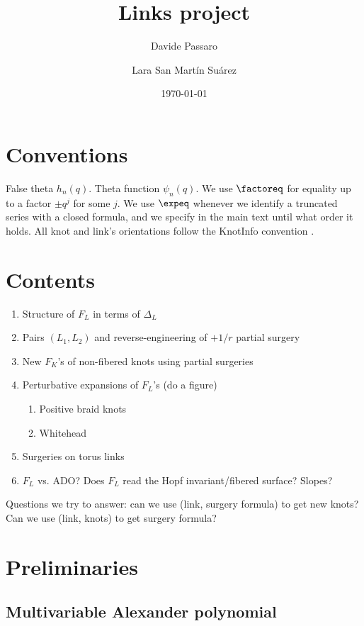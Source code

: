 \documentclass[11pt,e-only]{amsart}
\title{Links project}
\author[D. Passaro]{Davide Passaro}
\author[L. San Mart\'in Su\'arez]{Lara San Mart\'in Su\'arez}
\date{\today}
\begin{document}
\maketitle

\section{Conventions} False theta $h_n(q)$. Theta function $\psi_n(q)$. We use $\factoreq$ for equality up to a factor $\pm q^j$ for some $j$. We use $\expeq$ whenever we identify a truncated series with a closed formula, and we specify in the main text until what order it holds. All knot and link's orientations follow the KnotInfo convention \cite{knotinfo}.



\section{Contents}

\begin{enumerate}
    \item Structure of $F_L$ in terms of $\Delta_L$
    \item Pairs $(L_1,L_2)$ and reverse-engineering of $+1/r$ partial surgery
    \item New $F_K$'s of non-fibered knots using partial surgeries
    \item Perturbative expansions of $F_L$'s (do a figure)
    \begin{enumerate}
        \item Positive braid knots
        \item Whitehead
    \end{enumerate}
    \item Surgeries on torus links
    \item $F_L$ vs. ADO? Does $F_L$ read the Hopf invariant/fibered surface? Slopes?
\end{enumerate}

Questions we try to answer: can we use (link, surgery formula) to get new knots? Can we use (link, knots) to get surgery formula?

\section{Preliminaries}

\subsection{Multivariable Alexander polynomial}
\end{document}
